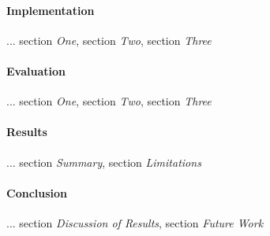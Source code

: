 \paragraph{Implementation} ... section \textit{One}, section \textit{Two}, section \textit{Three}

\paragraph{Evaluation} ... section \textit{One}, section \textit{Two}, section \textit{Three}

\paragraph{Results} ... section \textit{Summary}, section \textit{Limitations}

\paragraph{Conclusion} ... section \textit{Discussion of Results}, section \textit{Future Work}